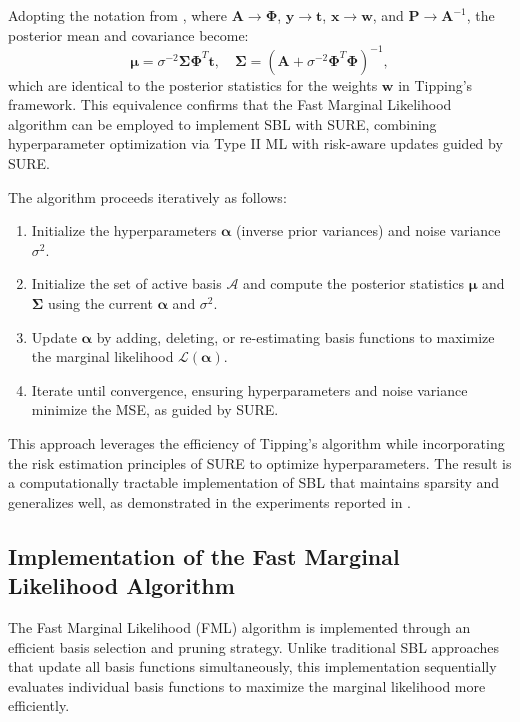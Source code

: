 \documentclass{article}
\begin{document}
Adopting the notation from \citet{tipp2003fastsb}, where \(\mathbf{A} \rightarrow \boldsymbol{\Phi}\), \(\mathbf{y} \rightarrow \mathbf{t}\), \(\mathbf{x} \rightarrow \mathbf{w}\), and \(\mathbf{P} \rightarrow \mathbf{A}^{-1}\), the posterior mean and covariance become:  
\begin{equation}
    \boldsymbol{\mu} = \sigma^{-2}\boldsymbol{\Sigma}\boldsymbol{\Phi}^T\mathbf{t}, \quad \boldsymbol{\Sigma} = \left(\mathbf{A} + \sigma^{-2}\boldsymbol{\Phi}^T\boldsymbol{\Phi}\right)^{-1},
\end{equation}  
which are identical to the posterior statistics for the weights \(\mathbf{w}\) in Tipping's framework. This equivalence confirms that the Fast Marginal Likelihood algorithm can be employed to implement SBL with SURE, combining hyperparameter optimization via Type II ML with risk-aware updates guided by SURE.  

The algorithm proceeds iteratively as follows:  
\begin{enumerate}  
    \item Initialize the hyperparameters \(\boldsymbol{\alpha}\) (inverse prior variances) and noise variance \(\sigma^2\).  
    \item Initialize the set of active basis $\mathcal{A}$ and compute the posterior statistics \(\boldsymbol{\mu}\) and \(\boldsymbol{\Sigma}\) using the current \(\boldsymbol{\alpha}\) and \(\sigma^2\).  
    \item Update \(\boldsymbol{\alpha}\) by adding, deleting, or re-estimating basis functions to maximize the marginal likelihood \(\mathcal{L}(\boldsymbol{\alpha})\).  
    \item Iterate until convergence, ensuring hyperparameters and noise variance minimize the MSE, as guided by SURE.  
\end{enumerate}  

This approach leverages the efficiency of Tipping's algorithm while incorporating the risk estimation principles of SURE to optimize hyperparameters. The result is a computationally tractable implementation of SBL that maintains sparsity and generalizes well, as demonstrated in the experiments reported in \citet{tipp2003fastsb}.


\subsection{Implementation of the Fast Marginal Likelihood Algorithm}

The Fast Marginal Likelihood (FML) algorithm is implemented through an efficient basis selection and pruning strategy. Unlike traditional SBL approaches that update all basis functions simultaneously, this implementation sequentially evaluates individual basis functions to maximize the marginal likelihood more efficiently.
\end{document}
